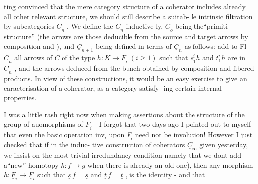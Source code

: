 ting convinced that the mere category structure of a coherator includes
already all other relevant structure, we should still describe a suitab-%
le intrinsic filtration by subcategories $\underline{C}_n$ . We define the $\underline{C}_n$ inductive%
ly, $\underline{C}_o$ being the``primiti structure'' (the arrows are those deducible
from the source and target arrows by composition and ), and
$\underline{C}_{n+1}$ being defined in terms of $\underline{C}_n$ as follows: add to Fl $\underline{C}_n$ all arrows 
of $\underline{C}$ of the type $h\colon K\to \underline{F}_i$ $(i\geq 1)$ such that $\underline{s}^i_1 h$ and $t^i_1 h$ are in $\underline{C}_n$ , and
the arrows deduced from the bunch obtained  by composition and
fibered products. In view of these constructions, it would be an easy
exercise to give an caracterisation of a coherator, as a category satisfy
-ing certain internal properties.

I was a little rash right now when making assertions about the
structure of the group of auomorphisms of $\underline{F}_i$ - I forgot that two days
ago I pointed out to myself that even the basic operation inv$_i$ upon $\underline{F}_i$
need not  be  involution! However I just checked that if in the induc-%
tive construction of coherators $\underline{C}_{\infty}$ given yesterday, we insist on the
most trivial irredundancy condition \hand{(} namely that we dont add a``new''
homotopy $h\colon f\to g$ when there is already an old one), then any morphism
$h\colon \underline{F}_i\to \underline{F}_i$ such that $\underline{s}\, f=\underline{s}$ and $\underline{t}\, f=\underline{t}$ , is the identity - and that

